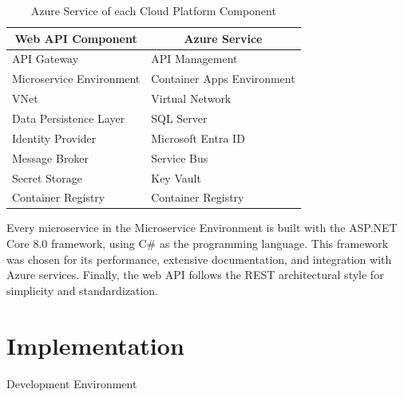 \documentclass[12pt,reqno, oneside]{amsbook}
\makeatletter
\def\section{\@startsection{section}{1}%
      \z@{.5\linespacing\@plus.7\linespacing}{.25\linespacing}%
      {\normalfont\bfseries\flushleft}}
\theoremstyle{definition}
\theoremstyle{definition}
\numberwithin{section}{chapter}
\numberwithin{table}{chapter}
\numberwithin{figure}{chapter}
\makeatother
\begin{document}
\begin{table}[h!]
  \centering
  \begin{tabular}{|l|l|}
    \hline
    \multicolumn{1}{|c|}{\textbf{Web \ac{API} Component}} & \multicolumn{1}{c|}{\textbf{Azure Service}} \\
    \hline
    \ac{API} Gateway                                      & API Management                              \\
    \hline
    Microservice Environment                              & Container Apps Environment                  \\
    \hline
    \ac{VNet}                                             & Virtual Network                             \\
    \hline
    Data Persistence Layer                                & SQL Server                                  \\
    \hline
    Identity Provider                                     & Microsoft Entra ID                          \\
    \hline
    Message Broker                                        & Service Bus                                 \\
    \hline
    Secret Storage                                        & Key Vault                                   \\
    \hline
    Container Registry                                    & Container Registry                          \\
    \hline
  \end{tabular}
  \vspace{10pt}
  \caption{Azure Service of each Cloud Platform Component}
  \label{Table:AzureServiceMapping}
\end{table}

Every microservice in the Microservice Environment is built with the ASP.NET Core 8.0 framework, using C\# as the programming language. This framework was chosen for its performance, extensive documentation, and integration with Azure services. Finally, the web \ac{API} follows the \ac{REST} architectural style for simplicity and standardization.

\chapter{Implementation}
\label{Chapter:Implementation}

\section{Development Environment}
\label{Section:Development_Environment}
\end{document}
